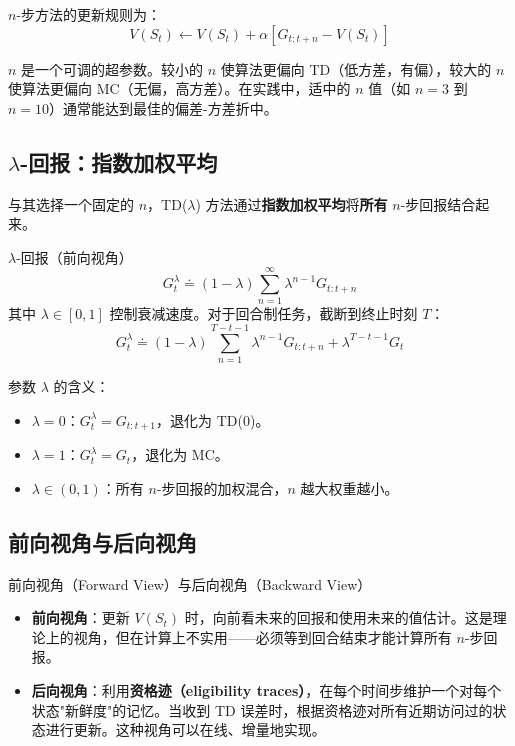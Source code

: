 $n$-步方法的更新规则为：
$$V(S_t) \leftarrow V(S_t) + \alpha [G_{t:t+n} - V(S_t)]$$

\begin{remark}
$n$ 是一个可调的超参数。较小的 $n$ 使算法更偏向 TD（低方差，有偏），较大的 $n$ 使算法更偏向 MC（无偏，高方差）。在实践中，适中的 $n$ 值（如 $n=3$ 到 $n=10$）通常能达到最佳的偏差-方差折中。
\end{remark}

\subsection{$\lambda$-回报：指数加权平均}

与其选择一个固定的 $n$，TD($\lambda$) 方法通过\textbf{指数加权平均}将\textbf{所有} $n$-步回报结合起来。

\begin{mydefinition}{$\lambda$-回报（前向视角）}
$$G_t^{\lambda} \doteq (1-\lambda) \sum_{n=1}^{\infty} \lambda^{n-1} G_{t:t+n}$$
其中 $\lambda \in [0,1]$ 控制衰减速度。对于回合制任务，截断到终止时刻 $T$：
$$G_t^{\lambda} \doteq (1-\lambda) \sum_{n=1}^{T-t-1} \lambda^{n-1} G_{t:t+n} + \lambda^{T-t-1} G_t$$
\end{mydefinition}

参数 $\lambda$ 的含义：
\begin{itemize}
    \item $\lambda = 0$：$G_t^{\lambda} = G_{t:t+1}$，退化为 TD(0)。
    \item $\lambda = 1$：$G_t^{\lambda} = G_t$，退化为 MC。
    \item $\lambda \in (0,1)$：所有 $n$-步回报的加权混合，$n$ 越大权重越小。
\end{itemize}

\subsection{前向视角与后向视角}

\begin{mydefinition}{前向视角（Forward View）与后向视角（Backward View）}
\begin{itemize}
    \item \textbf{前向视角}：更新 $V(S_t)$ 时，向前看未来的回报和使用未来的值估计。这是理论上的视角，但在计算上不实用——必须等到回合结束才能计算所有 $n$-步回报。
    \item \textbf{后向视角}：利用\textbf{资格迹（eligibility traces）}，在每个时间步维护一个对每个状态"新鲜度"的记忆。当收到 TD 误差时，根据资格迹对所有近期访问过的状态进行更新。这种视角可以在线、增量地实现。
\end{itemize}
\end{mydefinition}


